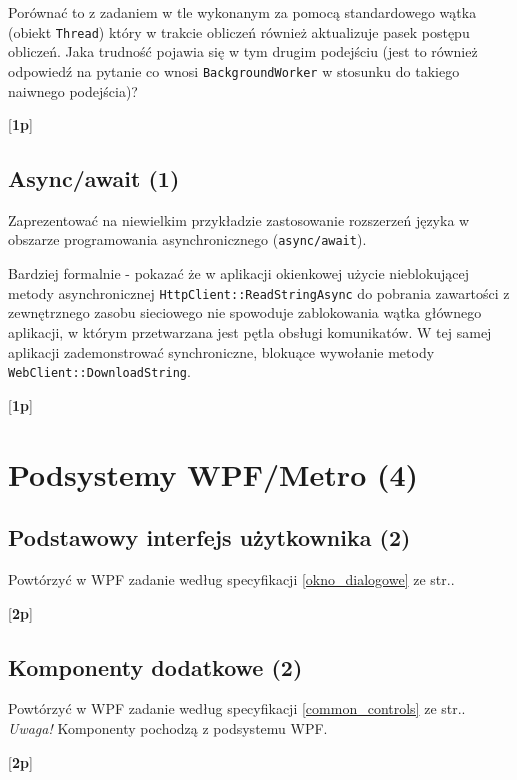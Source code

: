 	Porównać to z zadaniem w tle wykonanym za pomocą standardowego wątka (obiekt {\tt Thread}) który w trakcie obliczeń również aktualizuje pasek	
	postępu obliczeń. Jaka trudność pojawia się w tym drugim podejściu (jest to również odpowiedź na pytanie co wnosi {\tt BackgroundWorker}
	w stosunku do takiego naiwnego podejścia)?

    [{\bf 1p}]  
	
\subsection{Async/await (1)}

	Zaprezentować na niewielkim przykładzie zastosowanie rozszerzeń języka w obszarze programowania asynchronicznego ({\tt async/await}).
	
	Bardziej formalnie - pokazać że w aplikacji okienkowej użycie nieblokującej metody asynchronicznej {\tt HttpClient::ReadStringAsync} 
	do pobrania zawartości z zewnętrznego zasobu sieciowego nie spowoduje zablokowania wątka głównego aplikacji, w którym przetwarzana jest pętla
	obsługi komunikatów. W tej samej aplikacji zademonstrować synchroniczne, blokuące wywołanie metody {\tt WebClient::DownloadString}.
	
    [{\bf 1p}]  

\section{Podsystemy WPF/Metro (4)}

\subsection{Podstawowy interfejs użytkownika (2)} 

    Powtórzyć w WPF zadanie według specyfikacji \ref{okno_dialogowe} ze str.\pageref{okno_dialogowe}.

    [{\bf 2p}]  

\subsection{Komponenty dodatkowe (2)} 

    Powtórzyć w WPF zadanie według specyfikacji \ref{common_controls} ze str.\pageref{common_controls}.
	{\em Uwaga!} Komponenty pochodzą z podsystemu WPF.

    [{\bf 2p}]  
	
